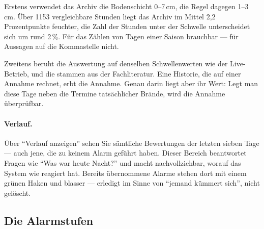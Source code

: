 \documentclass[11pt,a4paper,DIV=12,parskip=half]{scrartcl}
\begin{document}
\begin{hinweis}
Erstens verwendet das Archiv die Bodenschicht 0--7\,cm, die Regel dagegen
1--3\,cm. Über 1153 vergleichbare Stunden liegt das Archiv im Mittel
2{,}2 Prozentpunkte feuchter, die Zahl der Stunden unter der Schwelle
unterscheidet sich um rund 2\,\%. Für das Zählen von Tagen einer Saison
brauchbar --- für Aussagen auf die Kommastelle nicht.

Zweitens beruht die Auswertung auf denselben Schwellenwerten wie der
Live-Betrieb, und die stammen aus der Fachliteratur. Eine Historie, die auf
einer Annahme rechnet, erbt die Annahme. Genau darin liegt aber ihr Wert:
Legt man diese Tage neben die Termine tatsächlicher Brände, wird die Annahme
überprüfbar.
\end{hinweis}

\paragraph{Verlauf.} Über \enquote{Verlauf anzeigen} sehen Sie sämtliche
Bewertungen der letzten sieben Tage --- auch jene, die zu keinem Alarm geführt
haben. Dieser Bereich beantwortet Fragen wie \enquote{Was war heute Nacht?}
und macht nachvollziehbar, worauf das System wie reagiert hat. Bereits
übernommene Alarme stehen dort mit einem grünen Haken und blasser --- erledigt
im Sinne von \enquote{jemand kümmert sich}, nicht gelöscht.

\subsection{Die Alarmstufen}
\end{document}
